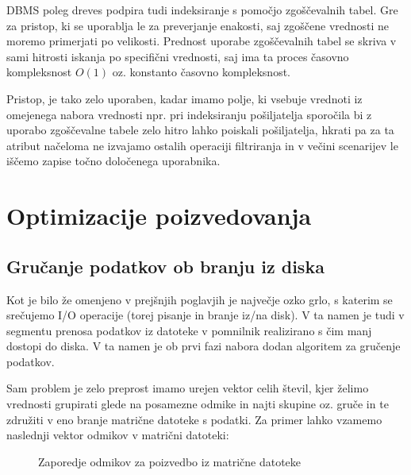 \documentclass[a4paper,12pt,openright]{book}
\begin{document}
        DBMS poleg dreves podpira tudi indeksiranje s pomočjo zgoščevalnih tabel. Gre za pristop, ki se uporablja le za preverjanje enakosti, saj zgoščene vrednosti ne moremo primerjati po velikosti.
        Prednost uporabe zgoščevalnih tabel se skriva v sami hitrosti iskanja po specifični vrednosti, saj ima ta proces časovno kompleksnost $O(1)$ oz. konstanto časovno kompleksnost.
        
        Pristop, je tako zelo uporaben, kadar imamo polje, ki vsebuje vrednoti iz omejenega nabora vrednosti npr. pri indeksiranju pošiljatelja sporočila bi z uporabo zgoščevalne tabele zelo hitro lahko poiskali pošiljatelja, hkrati pa za ta atribut načeloma ne izvajamo ostalih operaciji filtriranja in v večini scenarijev le iščemo zapise točno določenega uporabnika.

    \section{Optimizacije poizvedovanja}
        
        \subsection{Gručanje podatkov ob branju iz diska}
        
        Kot je bilo že omenjeno v prejšnjih poglavjih je največje ozko grlo, s katerim se srečujemo I/O operacije (torej pisanje in branje iz/na disk). V ta namen je tudi v segmentu prenosa podatkov iz datoteke v pomnilnik realizirano s čim manj dostopi do diska. V ta namen je ob prvi fazi nabora dodan algoritem za gručenje podatkov.

        Sam problem je zelo preprost imamo urejen vektor celih števil, kjer želimo vrednosti grupirati glede na posamezne odmike in najti skupine oz. gruče in te združiti v eno branje matrične datoteke s podatki. Za primer lahko vzamemo naslednji vektor odmikov v matrični datoteki:

\hfill \break
\begin{figure}[h]
\begin{center}
\caption{Zaporedje odmikov za poizvedbo iz matrične datoteke}
\end{center}
\end{figure}
\end{document}
